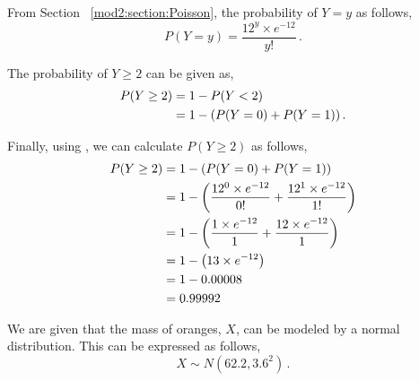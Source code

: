 \begin{subquestions}
\begin{subsubquestions}
From Section ~\ref{mod2:section:Poisson}, the probability of $Y=y$ as follows,
\begin{equation}
	P(Y=y) = \frac{12^{y} \times e^{-12}}{y!} \,. \label{2014:q4:PoisEqn2}
\end{equation}

The probability of $Y \geq 2$ can be given as,
\begin{align}
	P(Y \geq 2) & = 1 - P(Y<2) \nonumber \\
	            & = 1 - (P(Y=0) + P(Y=1)) \,.
\end{align}

Finally, using , we can calculate  $P(Y \geq 2)$ as follows,
\begin{align}
	P(Y \geq 2) & = 1 - (P(Y=0) + P(Y=1)) \nonumber \\
	            & = 1 - \left(\frac{12^{0} \times e^{-12}}{0!} + \frac{12^{1} \times e^{-12}}{1!} \right) \nonumber \\
	            & = 1 - \left(\frac{1 \times e^{-12}}{1} + \frac{12 \times e^{-12}}{1} \right) \nonumber \\
	            & = 1 - \left(13 \times e^{-12} \right) \nonumber \\
	            & = 1 - 0.00008 \nonumber \\
	            & = 0.99992
\end{align}

\end{subsubquestions}

	
\subquestion

We are given that the mass of oranges, $X$, can be modeled by a normal distribution. This can be expressed as follows,
\begin{equation}
	X \sim N(62.2, 3.6^2) \,.
\end{equation}

\begin{subsubquestions}
	
\subsubquestion


\end{subsubquestions}
\end{subquestions}
